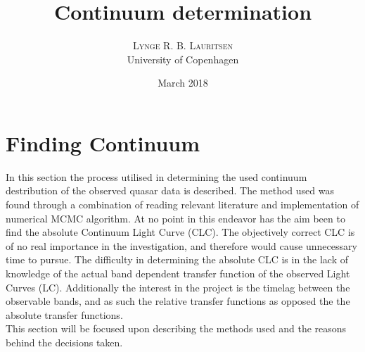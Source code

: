 \documentclass[twocolumn]{article}
\title{\vspace{-20mm}\fontsize{16pt}{10pt}\selectfont\textbf{Continuum determination}} %
\author{
\textsc{Lynge R. B. Lauritsen} \\
\normalsize University of Copenhagen \\ %
\date{March 2018}
\vspace{-9mm}
}
\begin{document}
\begin{multicols}{1}
\maketitle %
\end{multicols}{}








\section{Finding Continuum}
In this section the process utilised in determining the used continuum destribution of the observed quasar data is described. The method used was found through a combination of reading relevant literature and implementation of numerical MCMC algorithm. At no point in this endeavor has the aim been to find the absolute Continuum Light Curve (CLC). The objectively correct CLC is of no real importance in the investigation, and therefore would cause unnecessary time to pursue. The difficulty in determining the absolute CLC is in the lack of knowledge of the actual band dependent transfer function of the observed Light Curves (LC). Additionally the interest in the project is the timelag between the observable bands, and as such the relative transfer functions as opposed the the absolute transfer functions. \\
This section will be focused upon describing the methods used and the reasons behind the decisions taken.\\
\end{document}
